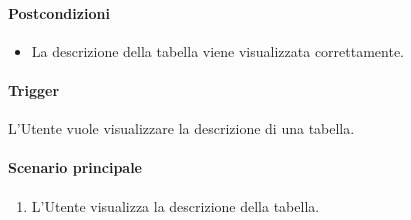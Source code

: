 \paragraph*{Postcondizioni}
\begin{itemize}
  \item La descrizione della tabella viene visualizzata correttamente.
\end{itemize}

\paragraph*{Trigger}
L'Utente vuole visualizzare la descrizione di una tabella.

\paragraph*{Scenario principale}
\begin{enumerate}
  \item L'Utente visualizza la descrizione della tabella.
\end{enumerate}